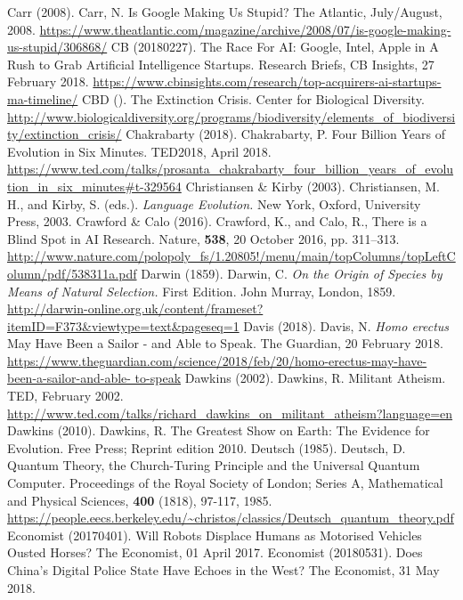 \begin{multicols}{2}
\begin{thebibliography}{99}
 Carr (2008). Carr, N. Is Google Making Us Stupid? The Atlantic, July/August, 2008. \url{https://www.theatlantic.com/magazine/archive/2008/07/is-google-making-us-stupid/306868/} 
 CB (20180227). The Race For AI: Google, Intel, Apple in A Rush to Grab Artificial Intelligence Startups. Research Briefs, CB Insights, 27 February 2018. \url{https://www.cbinsights.com/research/top-acquirers-ai-startups-ma-timeline/}
 CBD (). The Extinction Crisis. Center for Biological Diversity. \url{http://www.biologicaldiversity.org/programs/biodiversity/elements_of_biodiversity/extinction_crisis/}
 Chakrabarty (2018). Chakrabarty, P. Four Billion Years of Evolution in Six Minutes. TED2018, April 2018. \url{https://www.ted.com/talks/prosanta_chakrabarty_four_billion_years_of_evolution_in_six_minutes#t-329564}
 Christiansen \& Kirby (2003). Christiansen, M. H., and Kirby, S. (eds.). \textit{Language Evolution.} New York, Oxford, University Press, 2003.
 Crawford \& Calo (2016). Crawford, K., and Calo, R., There is a Blind Spot in AI Research. Nature, \textbf{538}, 20 October 2016, pp. 311--313. \url{http://www.nature.com/polopoly_fs/1.20805!/menu/main/topColumns/topLeftColumn/pdf/538311a.pdf}
 Darwin (1859). Darwin, C. \textit{On the Origin of Species by Means of Natural Selection.} First Edition. John Murray, London, 1859. \url{http://darwin-online.org.uk/content/frameset?itemID=F373&viewtype=text&pageseq=1} 
 Davis (2018). Davis, N. \textit{Homo erectus} May Have Been a Sailor - and Able to Speak. The Guardian, 20 February 2018. \url{https://www.theguardian.com/science/2018/feb/20/homo-erectus-may-have-been-a-sailor-and-able- to-speak}
 Dawkins (2002). Dawkins, R. Militant Atheism. TED, February 2002. \url{http://www.ted.com/talks/richard_dawkins_on_militant_atheism?language=en}
 Dawkins (2010). Dawkins, R. The Greatest Show on Earth: The Evidence for Evolution. Free Press; Reprint edition 2010.
 Deutsch (1985). Deutsch, D. Quantum Theory, the Church-Turing Principle and the Universal Quantum Computer. Proceedings of the Royal Society of London; Series A, Mathematical and Physical Sciences, \textbf{400} (1818), 97-117, 1985. \url{https://people.eecs.berkeley.edu/~christos/classics/Deutsch_quantum_theory.pdf}
 Economist (20170401). Will Robots Displace Humans as Motorised Vehicles Ousted Horses? The Economist, 01 April 2017.
 Economist (20180531). Does China's Digital Police State Have Echoes in the West? The Economist, 31 May 2018.

\end{thebibliography}
\end{multicols}
